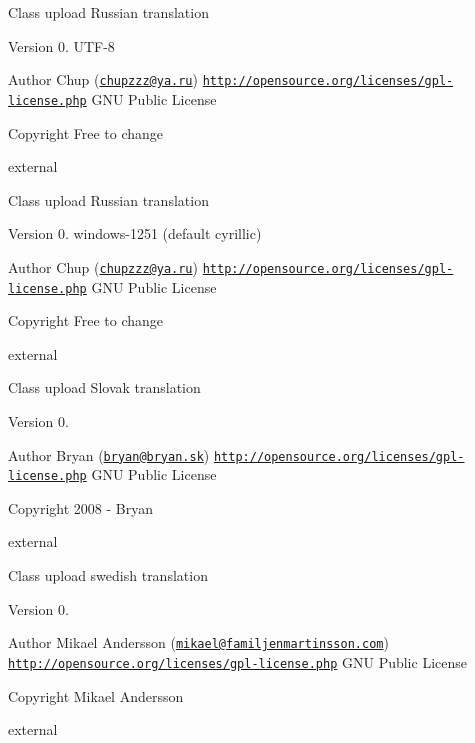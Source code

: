 Class upload Russian translation

\begin{DoxyVersion}{Version}
0.  U\+T\+F-\/8 
\end{DoxyVersion}
\begin{DoxyAuthor}{Author}
Chup (\href{mailto:chupzzz@ya.ru}{\tt chupzzz@ya.\+ru})  \href{http://opensource.org/licenses/gpl-license.php}{\tt http\+://opensource.\+org/licenses/gpl-\/license.\+php} G\+N\+U Public License 
\end{DoxyAuthor}
\begin{DoxyCopyright}{Copyright}
Free to change
\end{DoxyCopyright}
external

Class upload Russian translation

\begin{DoxyVersion}{Version}
0.  windows-\/1251 (default cyrillic) 
\end{DoxyVersion}
\begin{DoxyAuthor}{Author}
Chup (\href{mailto:chupzzz@ya.ru}{\tt chupzzz@ya.\+ru})  \href{http://opensource.org/licenses/gpl-license.php}{\tt http\+://opensource.\+org/licenses/gpl-\/license.\+php} G\+N\+U Public License 
\end{DoxyAuthor}
\begin{DoxyCopyright}{Copyright}
Free to change
\end{DoxyCopyright}
external

Class upload Slovak translation

\begin{DoxyVersion}{Version}
0. 
\end{DoxyVersion}
\begin{DoxyAuthor}{Author}
Bryan (\href{mailto:bryan@bryan.sk}{\tt bryan@bryan.\+sk})  \href{http://opensource.org/licenses/gpl-license.php}{\tt http\+://opensource.\+org/licenses/gpl-\/license.\+php} G\+N\+U Public License 
\end{DoxyAuthor}
\begin{DoxyCopyright}{Copyright}
2008 -\/ Bryan
\end{DoxyCopyright}
external

Class upload swedish translation

\begin{DoxyVersion}{Version}
0. 
\end{DoxyVersion}
\begin{DoxyAuthor}{Author}
Mikael Andersson (\href{mailto:mikael@familjenmartinsson.com}{\tt mikael@familjenmartinsson.\+com})  \href{http://opensource.org/licenses/gpl-license.php}{\tt http\+://opensource.\+org/licenses/gpl-\/license.\+php} G\+N\+U Public License 
\end{DoxyAuthor}
\begin{DoxyCopyright}{Copyright}
Mikael Andersson
\end{DoxyCopyright}
external

